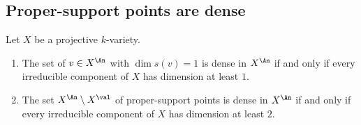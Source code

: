 \subsection{Proper-support points are dense}
\label{sec:ch32-proper-support-dense}

\begin{proposition}
\label{prop:ch32-proper-support-dense}
Let $X$ be a projective $k$-variety.
\begin{enumerate}
\item\label{itm:ch32-psd:one}
The set of $v\in X^{\An}$ with $\dim s(v)=1$ is dense in $X^{\An}$ if
and only if every irreducible component of $X$ has dimension at least
$1$.
\item\label{itm:ch32-psd:two}
The set $X^{\An}\setminus X^{\val}$ of proper-support points is dense in
$X^{\An}$ if and only if every irreducible component of $X$ has
dimension at least $2$.
\end{enumerate}
\end{proposition}

